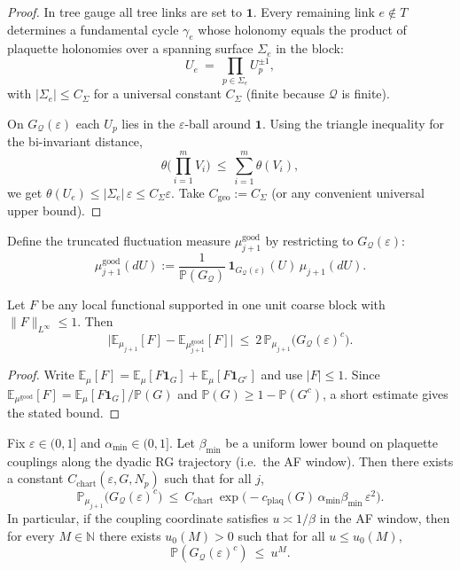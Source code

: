 \begin{proof}
In tree gauge all tree links are set to $\mathbf 1$. Every remaining link $e\notin T$ determines a fundamental cycle $\gamma_e$
whose holonomy equals the product of plaquette holonomies over a spanning surface $\Sigma_e$ in the block:
\[
U_e\ =\ \prod_{p\in\Sigma_e} U_p^{\pm 1},
\]
with $|\Sigma_e|\le C_\Sigma$ for a universal constant $C_\Sigma$ (finite because $\mathcal Q$ is finite).

On $G_{\mathcal Q}(\varepsilon)$ each $U_p$ lies in the $\varepsilon$-ball around $\mathbf 1$.
Using the triangle inequality for the bi-invariant distance,
\[
\theta\Big(\prod_{i=1}^m V_i\Big)\ \le\ \sum_{i=1}^m \theta(V_i),
\]
we get $\theta(U_e)\le |\Sigma_e|\,\varepsilon\le C_\Sigma\varepsilon$.
Take $C_{\mathrm{geo}}:=C_\Sigma$ (or any convenient universal upper bound).
\end{proof}

Define the truncated fluctuation measure $\mu_{j+1}^{\mathrm{good}}$ by restricting to $G_{\mathcal Q}(\varepsilon)$:
\[
\mu_{j+1}^{\mathrm{good}}(dU):=\frac{1}{\mathbb P(G_{\mathcal Q})}\,\mathbf 1_{G_{\mathcal Q}(\varepsilon)}(U)\,\mu_{j+1}(dU).
\]

\begin{lemma}\label{lem:trunc_stability}
Let $F$ be any local functional supported in one unit coarse block with $\|F\|_{L^\infty}\le 1$.
Then
\[
\big|\mathbb E_{\mu_{j+1}}[F]-\mathbb E_{\mu_{j+1}^{\mathrm{good}}}[F]\big|
\ \le\ 2\,\mathbb P_{\mu_{j+1}}\big(G_{\mathcal Q}(\varepsilon)^c\big).
\]
\end{lemma}

\begin{proof}
Write $\mathbb E_\mu[F]=\mathbb E_\mu[F\mathbf 1_G]+\mathbb E_\mu[F\mathbf 1_{G^c}]$ and use $|F|\le 1$.
Since $\mathbb E_{\mu^{\mathrm{good}}}[F]=\mathbb E_\mu[F\mathbf 1_G]/\mathbb P(G)$ and $\mathbb P(G)\ge 1-\mathbb P(G^c)$,
a short estimate gives the stated bound.
\end{proof}

\begin{proposition}\label{prop:chart_error_small}
Fix $\varepsilon\in(0,1]$ and $\alpha_{\min}\in(0,1]$. Let $\beta_{\min}$ be a uniform lower bound on plaquette couplings along the dyadic RG trajectory
(i.e.\ the AF window). Then there exists a constant $C_{\mathrm{chart}}(\varepsilon,G,N_p)$ such that for all $j$,
\[
\mathbb P_{\mu_{j+1}}\big(G_{\mathcal Q}(\varepsilon)^c\big)\ \le\ C_{\mathrm{chart}}\,
\exp\!\big(-c_{\mathrm{plaq}}(G)\,\alpha_{\min}\beta_{\min}\,\varepsilon^2\big).
\]
In particular, if the coupling coordinate satisfies $u\asymp 1/\beta$ in the AF window, then for every $M\in\mathbb N$ there exists $u_0(M)>0$ such that
for all $u\le u_0(M)$,
\[
\mathbb P(G_{\mathcal Q}(\varepsilon)^c)\ \le\ u^M.
\]
\end{proposition}

